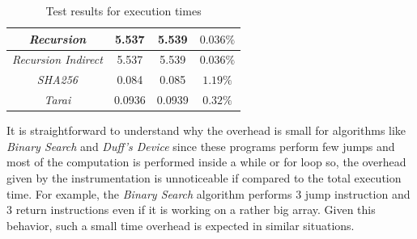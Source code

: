 \begin{table}
\begin{tabular}{|c|c|c|c|}
    \hline
    \textit{Recursion}                   & 5.537                        & 5.539                        & $0.036\%$              \\
    \hline
    \textit{Recursion Indirect}          & 5.537                        & 5.539                        & $0.036\%$              \\
    \hline
    \textit{SHA256}                      & 0.084                        & 0.085                        & $1.19\%$               \\
    \hline
    \textit{Tarai}                       & 0.0936                       & 0.0939                       & $0.32\%$               \\
    \hline
  \end{tabular}
  \caption{Test results for execution times}
  \label{tab:times}
\end{table}

It is straightforward to understand why the overhead is small for algorithms like
\textit{Binary Search} and \textit{Duff's Device} since these programs perform few
jumps and most of the computation is performed inside a while or for loop so,
the overhead given by the instrumentation is unnoticeable if compared to the
total execution time. For example, the \textit{Binary Search} algorithm performs
$3$ jump instruction and $3$ return instructions even if it is working on a rather
big array. Given this behavior, such a small time overhead is expected in similar
situations.

